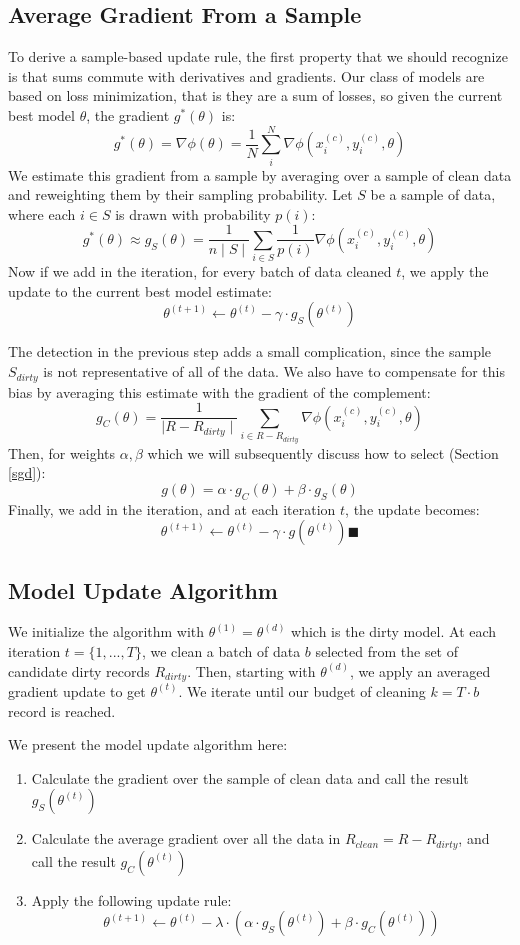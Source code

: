 \subsection{Average Gradient From a Sample}
To derive a sample-based update rule, the first property that we should recognize is that sums commute with derivatives and gradients.
Our class of models are based on loss minimization, that is they are a sum of losses, so given the current best model $\theta$, the gradient $g^*(\theta)$ is:
\[
g^*(\theta) = \nabla\phi(\theta) = \frac{1}{N} \sum_i^N \nabla\phi(x_i^{(c)},y_i^{(c)},\theta)
\]
We estimate this gradient from a sample by averaging over a sample of clean data and reweighting them by their sampling probability.
Let $S$ be a sample of data, where each $i \in S$ is drawn with probability $p(i)$:
\[
g^*(\theta) \approx g_{S}(\theta) = \frac{1}{n\mid S \mid} \sum_{i \in S}\frac{1}{p(i)}\nabla\phi(x_i^{(c)},y_i^{(c)},\theta)
\]
Now if we add in the iteration, for every batch of data cleaned $t$, we apply the update to the current best model estimate:
\[
\theta^{(t+1)} \leftarrow \theta^{(t)} - \gamma \cdot g_{S}(\theta^{(t)})
\]

The detection in the previous step adds a small complication, since the sample $S_{dirty}$ is not representative of all of the data.
We also have to compensate for this bias by averaging this estimate with the gradient of the complement:
\[
g_C(\theta) = \frac{1}{\mid R - R_{dirty}\mid}\sum_{i \in R - R_{dirty}}\nabla\phi(x_i^{(c)},y_i^{(c)},\theta)
\]
Then, for weights $\alpha,\beta$ which we will subsequently discuss how to select (Section \ref{sgd}):
\[
g(\theta) = \alpha \cdot g_C(\theta) + \beta \cdot g_S(\theta)
\]
Finally, we add in the iteration, and at each iteration $t$, the update becomes:
\[
\theta^{(t+1)} \leftarrow \theta^{(t)} - \gamma \cdot g(\theta^{(t)}) \blacksquare
\]

\subsection{Model Update Algorithm}
We initialize the algorithm with $\theta^{(1)} = \theta^{(d)}$ which is the dirty model.
At each iteration $t=\{1,...,T\}$, we clean a batch of data $b$ selected from the set of candidate dirty records $R_{dirty}$.
Then, starting with $\theta^{(d)}$, we apply an averaged gradient update to get $\theta^{(t)}$.
We iterate until our budget of cleaning $k = T \cdot b$ record is reached.

We present the model update algorithm here:
\begin{enumerate}[noitemsep]
	\item Calculate the gradient over the sample of clean data and call the result $g_S(\theta^{(t)})$
	\item Calculate the average gradient over all the data in $R_{clean}=R-R_{dirty}$, and call the result $g_C(\theta^{(t)})$
	\item Apply the following update rule:
	\[
	\theta^{(t+1)} \leftarrow \theta^{(t)} - \lambda \cdot(\alpha\cdot g_S(\theta^{(t)}) + \beta \cdot  g_C(\theta^{(t)}))
	\]
\end{enumerate} 

